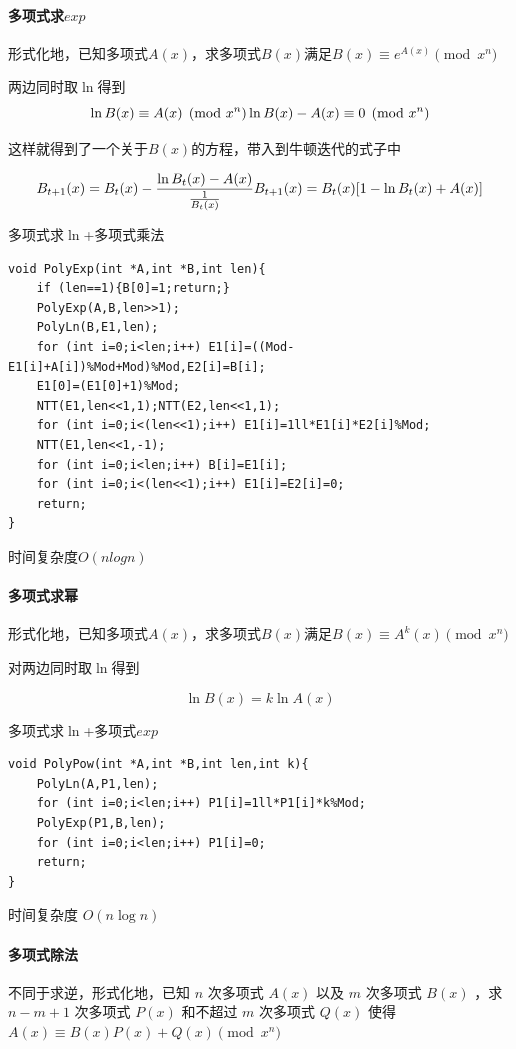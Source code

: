 \documentclass[UTF-8]{ctexart}
\begin{document}
	\paragraph{多项式求$exp$}形式化地，已知多项式$A(x)$，求多项式$B(x)$满足$B(x) \equiv e^{A(x)} \pmod{x^n}$  
	
	两边同时取$\ln$得到
	$$\ln{B(x)} \equiv A(x) \pmod{x^n} \\\\ \ln{B(x)}-A(x) \equiv 0 \pmod{x^n}$$
	
	这样就得到了一个关于$B(x)$的方程，带入到牛顿迭代的式子中
	
	$$B _ {t+1}(x)=B _ t(x)-\frac{\ln{B _ t(x)}-A(x)}{\frac{1}{B _ t(x)}} \\\\ B _ {t+1}(x)=B _ t(x)[1-\ln{B _ t(x)}+A(x)]$$
	
	多项式求$\ln$+多项式乘法
	
\begin{verbatim}
void PolyExp(int *A,int *B,int len){
    if (len==1){B[0]=1;return;}
    PolyExp(A,B,len>>1);
    PolyLn(B,E1,len);
    for (int i=0;i<len;i++) E1[i]=((Mod-E1[i]+A[i])%Mod+Mod)%Mod,E2[i]=B[i];
    E1[0]=(E1[0]+1)%Mod;
    NTT(E1,len<<1,1);NTT(E2,len<<1,1);
    for (int i=0;i<(len<<1);i++) E1[i]=1ll*E1[i]*E2[i]%Mod;
    NTT(E1,len<<1,-1);
    for (int i=0;i<len;i++) B[i]=E1[i];
    for (int i=0;i<(len<<1);i++) E1[i]=E2[i]=0;
    return;
}
\end{verbatim}
	
	时间复杂度$O(nlogn)$
	\paragraph{多项式求幂} 形式化地，已知多项式$A(x)$，求多项式$B(x)$满足$B(x) \equiv A^k(x) \pmod{x^n}$  
	
	对两边同时取$\ln$得到
	
	$$\ln{B(x)}=k \ln{A(x)}$$
	
	多项式求$\ln$+多项式$exp$
	
\begin{verbatim}
void PolyPow(int *A,int *B,int len,int k){
    PolyLn(A,P1,len);
    for (int i=0;i<len;i++) P1[i]=1ll*P1[i]*k%Mod;
    PolyExp(P1,B,len);
    for (int i=0;i<len;i++) P1[i]=0;
    return;
}
\end{verbatim}
	时间复杂度 $O(n\log n)$
	\paragraph{多项式除法} 不同于求逆，形式化地，已知 $n$ 次多项式 $A(x)$ 以及 $m$ 次多项式 $B(x)$ ，求 $n-m+1$ 次多项式 $P(x)$ 和不超过 $m$ 次多项式 $Q(x)$ 使得 $A(x)\equiv B(x)P(x)+Q(x) \pmod{x^n}$
	
\end{document}
